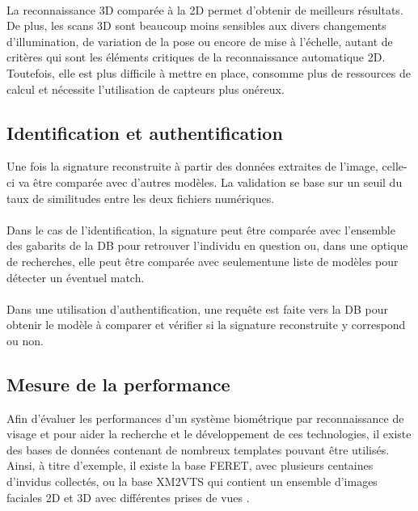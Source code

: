 \paragraph{}
La reconnaissance 3D comparée à la 2D permet d'obtenir de meilleurs résultats.
\\
De plus, les scans 3D sont beaucoup moins sensibles aux divers changements d’illumination, de variation de la pose ou encore de mise à l’échelle, autant de critères qui sont les éléments critiques de la reconnaissance automatique 2D.
\\
Toutefois, elle est plus difficile à mettre en place, consomme plus de ressources de calcul et nécessite l'utilisation de capteurs plus onéreux.

\subsection{Identification et authentification}\label{id-vs-auth}
Une fois la signature reconstruite à partir des données extraites de l'image, celle-ci va être comparée avec d'autres modèles. La validation se base sur un seuil du taux de similitudes entre les deux fichiers numériques.
\paragraph{}Dans le cas de l'identification, la signature peut être comparée avec l'ensemble des gabarits de la DB pour retrouver l'individu en question ou, dans une optique de recherches, elle peut être comparée avec seulementune liste de modèles pour détecter un éventuel match.
\paragraph{}Dans une utilisation d'authentification, une requête est faite vers la DB pour obtenir le modèle à comparer et vérifier si la signature reconstruite y correspond ou non.
\subsection{Mesure de la performance}
Afin d'évaluer les performances d'un système biométrique par reconnaissance de visage et pour aider la recherche et le développement de ces technologies, il existe des bases de données contenant de nombreux templates pouvant être utilisés. Ainsi, à titre d'exemple, il existe la base FERET, avec plusieurs centaines d'invidus collectés, ou la base XM2VTS qui contient un ensemble d'images faciales 2D et 3D avec différentes prises de vues \cite{Xphdthesis_3}.

